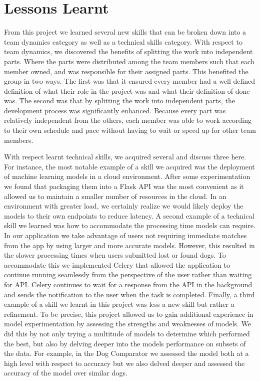 \documentclass{article}
\begin{document}
\section{Lessons Learnt}
From this project we learned several new skills that can be broken down into a team dynamics category as well as a technical skills category.  With respect to team dynamics, we discovered the benefits of splitting the work into independent parts.  Where the parts were distributed among the team members such that each member owned, and was responsible for their assigned parts.  This benefited the group in two ways.  The first was that it ensured every member had a well defined definition of what their role in the project was and what their definition of done was.  The second was that by splitting the work into independent parts, the development process was significantly enhanced.  Because every part was relatively independent from the others, each member was able to work according to their own schedule and pace without having to wait or speed up for other team members.  

With respect learnt technical skills, we acquired several and discuss three here.  For instance, the most notable example of a skill we acquired was the deployment of machine learning models in a cloud environment.  After some experimentation we found that packaging them into a Flask API was the most convenient as it allowed us to maintain a smaller number of resources in the cloud.  In an environment with greater load, we certainly realize we would likely deploy the models to their own endpoints to reduce latency.  A second example of a technical skill we learned was how to accommodate the processing time models can require.  In our application we take advantage of users not requiring immediate matches from the app by using larger and more accurate models.  However, this resulted in the slower processing times when users submitted lost or found dogs.  To accommodate this we implemented Celery that allowed the application to continue running seamlessly from the perspective of the user rather than waiting for API.  Celery continues to wait for a response from the API in the background and sends the notification to the user when the task is completed.  Finally, a third example of a skill we learnt in this project was less a new skill but rather a refinement.  To be precise, this project allowed us to gain additional experience in model experimentation by assessing the strengths and weaknesses of models.  We did this by not only trying a multitude of models to determine which performed the best, but also by delving deeper into the models performance on subsets of the data.  For example, in the Dog Comparator we assessed the model both at a high level with respect to accuracy but we also delved deeper and assessed the accuracy of the model over similar dogs.
\end{document}
